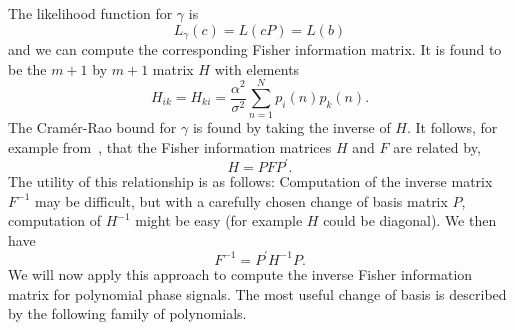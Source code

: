 \documentclass[5p]{elsarticle}
\begin{document}
The likelihood function for $\gamma$ is 
\[
L_\gamma(c) = L(cP) = L(b)
\] 
and we can compute the corresponding Fisher information matrix.  It is found to be the $m+1$ by $m+1$ matrix $H$ with elements
\[
H_{ik} = H_{ki} = \frac{\alpha^2}{\sigma^2}\sum_{n=1}^{N} p_{i}(n) p_{k}(n).
\]
The Cram\'{e}r-Rao bound for $\gamma$ is found by taking the inverse of $H$.  It follows, for example from~\cite[Sec. 3.8]{Kay1993_stat_sig_est_theory}, that the Fisher information matrices $H$ and $F$ are related by,
\[
H = P F P^\prime.
\]
The utility of this relationship is as follows:  Computation of the inverse matrix $F^{-1}$ may be difficult, but with a carefully chosen change of basis matrix $P$, computation of $H^{-1}$ might be easy (for example $H$ could be diagonal).  We then have
\[
F^{-1} = P^\prime H^{-1} P.
\]  
We will now apply this approach to compute the inverse Fisher information matrix for polynomial phase signals.  The most useful change of basis is described by the following family of polynomials.


\end{document}
